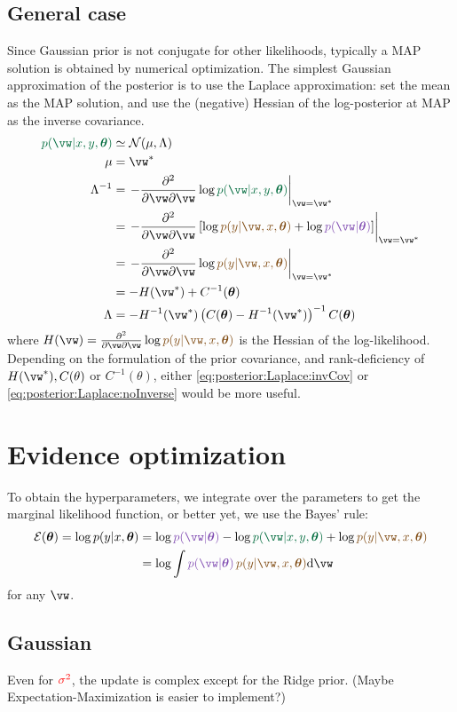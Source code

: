 \documentclass{article}
\newcounter{ct}
\newcommand{\inv}{^{-1}}
\newcommand{\Gaussian}{\ensuremath{\mathcal{N}}} %
\newcommand{\weight}{\vw}
\newcommand{\hyp}{\bm{\theta}}
\newcommand{\likelihood}{\ensuremath{\textcolor{goldenbrown}{p(y|\weight,x,\hyp)}}}
\newcommand{\prior}{\ensuremath{\textcolor{amethyst}{p(\weight|\hyp)}}}
\newcommand{\posterior}{\textcolor{cadmiumgreen}{p(\weight|x,y,\hyp)}}
\begin{document}
\subsection{General case}
Since Gaussian prior is not conjugate for other likelihoods, typically a MAP solution is obtained by numerical optimization.
The simplest Gaussian approximation of the posterior is to use the Laplace approximation: set the mean as the MAP solution, and use the (negative) Hessian of the log-posterior at MAP as the inverse covariance.
\begin{align}
    \posterior &\simeq \Gaussian(\mu, \Lambda)
    \label{eq:posterior:Laplace}
    \\
    \mu &= \weight^\ast
    \\
    \Lambda\inv &= 
	\left.
	-\frac{\partial^2}{\partial \weight \partial \weight}
	\log \posterior \right\vert_{\weight = \weight^\ast}
	\\
	&=
	\left.
	-\frac{\partial^2}{\partial \weight \partial \weight}
	\left[ \log\likelihood + \log\prior \right]
	\right\vert_{\weight = \weight^\ast}
	\\
	&=
	\left.
	-\frac{\partial^2}{\partial \weight \partial \weight}
	\log\likelihood
	\right\vert_{\weight = \weight^\ast}
	\\
	&=
	- H(\weight^\ast)
	+ C\inv(\hyp)
	\label{eq:posterior:Laplace:invCov}
	\\
    \Lambda &=
	- H\inv(\weight^\ast)
	\left(
	    C(\hyp)
	    - H\inv (\weight^\ast)
	\right)\inv
	C(\hyp)
	\label{eq:posterior:Laplace:noInverse}
\end{align}
where 
$ H(\weight) = 
    \frac{\partial^2}{\partial \weight \partial \weight}
    \log\likelihood$ is the Hessian of the log-likelihood.
Depending on the formulation of the prior covariance, and rank-deficiency of $H(\weight^\ast), C(\theta)$ or $C\inv(\theta)$, either \eqref{eq:posterior:Laplace:invCov} or \eqref{eq:posterior:Laplace:noInverse} would be more useful.

\section{Evidence optimization}
To obtain the hyperparameters, we integrate over the parameters to get the marginal likelihood function, or better yet, we use the Bayes' rule:
\begin{align}
    \mathcal{E}(\hyp) = \log p(y|x,\hyp)
	&= \log\prior - \log\posterior + \log\likelihood
	\\
	&= \log \int \prior\,\likelihood \mathrm{d}\weight
\end{align}
for any $\weight$.

\subsection{Gaussian}
Even for $\textcolor{red}{\sigma^2}$, the update is complex except for the Ridge prior. (Maybe Expectation-Maximization is easier to implement?)
\end{document}
